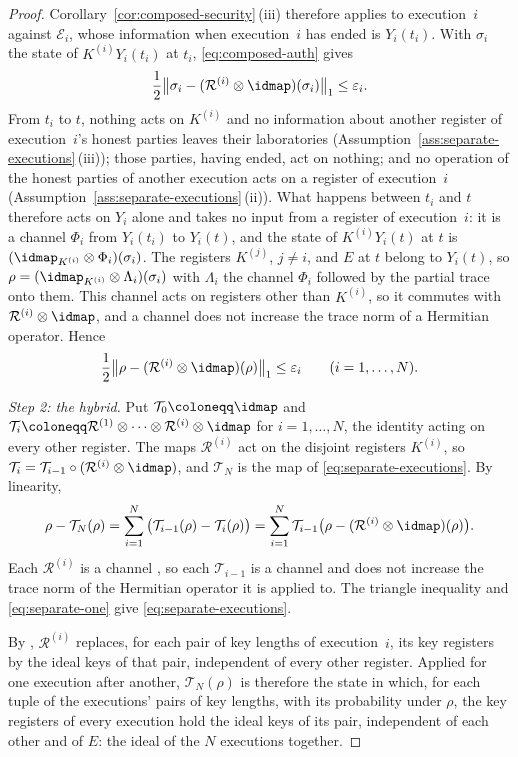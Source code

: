 \begin{proof}
Corollary~\ref{cor:composed-security}\,(iii) therefore applies to
execution~$i$ against $\mathcal E_i$, whose information when execution~$i$
has ended is $Y_i(t_i)$. With $\sigma_i$ the state of $K^{(i)}Y_i(t_i)$ at
$t_i$, \eqref{eq:composed-auth} gives
\begin{equation*}
  \frac12\big\|\sigma_i-(\mathcal R^{(i)}\otimes\idmap)(\sigma_i)\big\|_1
  \le\varepsilon_i .
\end{equation*}
From $t_i$ to $t$, nothing acts on $K^{(i)}$ and no information about
another register of execution~$i$'s honest parties leaves their
laboratories (Assumption~\ref{ass:separate-executions}\,(iii)); those
parties, having ended, act on nothing; and no operation of the honest
parties of another execution acts on a register of execution~$i$
(Assumption~\ref{ass:separate-executions}\,(ii)). What happens between
$t_i$ and $t$ therefore acts on $Y_i$ alone and takes no input from a
register of execution~$i$: it is a channel $\Phi_i$ from $Y_i(t_i)$ to
$Y_i(t)$, and the state of $K^{(i)}Y_i(t)$ at $t$ is
$(\idmap_{K^{(i)}}\otimes\Phi_i)(\sigma_i)$. The registers $K^{(j)}$,
$j\ne i$, and $E$ at $t$ belong to $Y_i(t)$, so
$\rho=(\idmap_{K^{(i)}}\otimes\Lambda_i)(\sigma_i)$ with $\Lambda_i$ the
channel $\Phi_i$ followed by the partial trace onto them. This channel acts
on registers other than $K^{(i)}$, so it commutes with
$\mathcal R^{(i)}\otimes\idmap$, and a channel does not increase the trace
norm of a Hermitian operator. Hence
\begin{equation}\label{eq:separate-one}
  \frac12\big\|\rho-(\mathcal R^{(i)}\otimes\idmap)(\rho)\big\|_1
  \le\varepsilon_i\qquad(i=1,\dots,N).
\end{equation}

\emph{Step 2: the hybrid.} Put $\mathcal T_0\coloneqq\idmap$ and
$\mathcal T_i\coloneqq\mathcal R^{(1)}\otimes\cdots\otimes
\mathcal R^{(i)}\otimes\idmap$ for $i=1,\dots,N$, the identity acting on
every other register. The maps $\mathcal R^{(i)}$ act on the disjoint
registers $K^{(i)}$, so
$\mathcal T_i=\mathcal T_{i-1}\circ(\mathcal R^{(i)}\otimes\idmap)$, and
$\mathcal T_N$ is the map of \eqref{eq:separate-executions}. By linearity,
\[
  \rho-\mathcal T_N(\rho)
  =\sum_{i=1}^{N}\big(\mathcal T_{i-1}(\rho)-\mathcal T_i(\rho)\big)
  =\sum_{i=1}^{N}\mathcal T_{i-1}\big(\rho-(\mathcal R^{(i)}\otimes
  \idmap)(\rho)\big).
\]
Each $\mathcal R^{(i)}$ is a channel
\cite[Sec.~3.3, Eqs.~(13), (17)]{tupkary2026decoy}, so each
$\mathcal T_{i-1}$ is a channel and does not increase the trace norm of the
Hermitian operator it is applied to. The triangle inequality and
\eqref{eq:separate-one} give \eqref{eq:separate-executions}.

By \cite[Sec.~3.3, Eqs.~(14), (16), (17)]{tupkary2026decoy},
$\mathcal R^{(i)}$ replaces, for each pair of key lengths of execution~$i$,
its key registers by the ideal keys of that pair, independent of every other
register. Applied for one execution after another, $\mathcal T_N(\rho)$ is
therefore the state in which, for each tuple of the executions' pairs of key
lengths, with its probability under $\rho$, the key registers of every
execution hold the ideal keys of its pair, independent of each other and of
$E$: the ideal of the $N$ executions together.
\end{proof}
